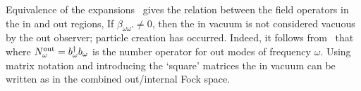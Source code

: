 Equivalence of the expansions \mlexp\ gives the relation between
the field operators in the in and out regions,
%
\eqn{}
%
If $\beta_{\omega\omega'}\neq0$, then the in vacuum is not considered
vacuous by the out observer;
particle creation has occurred.
Indeed, it follows from \opreln\ that
%
\eqn{}
%
where $N_\omega^{\rm out}=b_\omega^\dagger b_\omega$ is the  number operator for
out
modes of frequency $\omega$.
Using matrix notation and introducing the `square' matrices
%
\eqn{}
%
the in vacuum can be written as
%
\eqn\vacreln{\invac \propto \exp\left\{-\hf \pmatrix{\bdag&\bhd\cr} B^*
A^{-1} \pmatrix{\bdag\cr\bhd\cr} \right\}\outvac\intvac\
}
%
in the combined out/internal Fock space.

